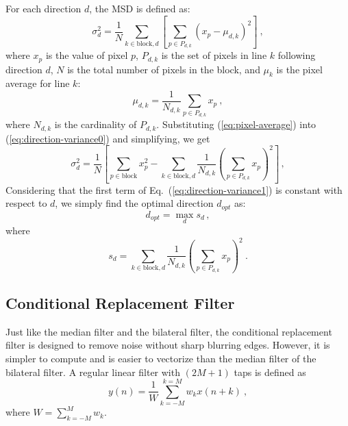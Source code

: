 \documentclass[smallabstract,smallcaptions]{dccpaper}
\begin{document}
\begin{figure}
\end{figure}
For each direction $d$, the MSD is defined as:
\begin{equation}
\sigma_{d}^{2}=\frac{1}{N}\sum_{k\in\mathrm{block},d}\left[\sum_{p\in P_{d,k}}\left(x_{p}-\mu_{d,k}\right)^{2}\right]\ ,\label{eq:direction-variance0}
\end{equation}
where $x_{p}$ is the value of pixel $p$, $P_{d,k}$ is the set of
pixels in line $k$ following direction $d$, $N$ is the total number
of pixels in the block, and $\mu_{k}$ is the pixel average for line
$k$:
\begin{equation}
\mu_{d,k}=\frac{1}{N_{d,k}}\sum_{p\in P_{d,k}}x_{p}\ ,\label{eq:pixel-average}
\end{equation}
where $N_{d,k}$ is the cardinality of $P_{d,k}$. Substituting (\ref{eq:pixel-average})
into (\ref{eq:direction-variance0}) and simplifying, we get
\begin{equation}
\sigma_{d}^{2}=\frac{1}{N}\left[\sum_{p\in\mathrm{block}}x_{p}^{2}-\sum_{k\in\mathrm{block},d}\frac{1}{N_{d,k}}\left(\sum_{p\in P_{d,k}}x_{p}\right)^{2}\right]\,,\label{eq:direction-variance1}
\end{equation}
Considering that the first term of Eq.~(\ref{eq:direction-variance1})
is constant with respect to $d$, we simply find the optimal direction
$d_{opt}$ as:
\begin{equation}
d_{opt}=\max_{d}s_{d}\,,\label{eq:direction-variance2}
\end{equation}
where
\begin{equation}
s_{d}=\sum_{k\in\mathrm{block},d}\frac{1}{N_{d,k}}\left(\sum_{p\in P_{d,k}}x_{p}\right)^{2}\ .\label{eq:direction-variance3}
\end{equation}

\subsection{Conditional Replacement Filter}

Just like the median filter and the bilateral filter, the conditional
replacement filter is designed to remove noise without sharp blurring
edges. However, it is simpler to compute and is easier to vectorize
than the median filter of the bilateral filter. A regular linear filter
with $\left(2M+1\right)$ taps is defined as
\begin{equation}
y\left(n\right)=\frac{1}{W}\sum_{k=-M}^{k=M}w_{k}x\left(n+k\right)\ ,\label{eq:linear-filter}
\end{equation}
where $W=\sum_{k=-M}^{M}w_{k}$.
\end{document}
